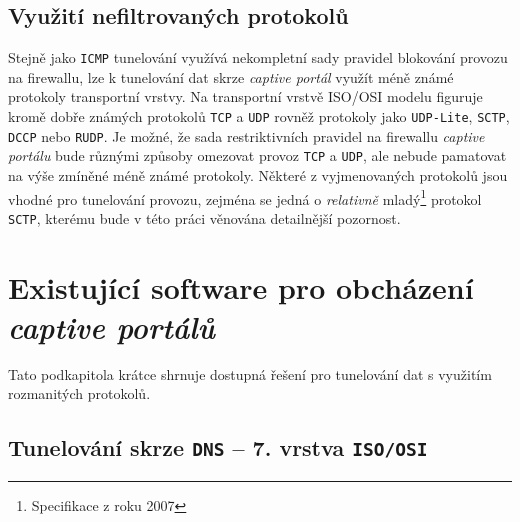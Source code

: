 \documentclass[thesis=M,czech]{FITthesis}[2012/10/20]
\begin{document}
\subsection{Využití nefiltrovaných protokolů}

Stejně jako \texttt{ICMP} tunelování využívá nekompletní sady pravidel blokování provozu na firewallu, lze k tunelování dat skrze \textit{captive portál} využít méně známé protokoly transportní vrstvy. Na transportní vrstvě ISO/OSI modelu figuruje kromě dobře známých protokolů \texttt{TCP} a \texttt{UDP} rovněž protokoly jako \texttt{UDP-Lite}, \texttt{SCTP}, \texttt{DCCP} nebo \texttt{RUDP}. Je možné, že sada restriktivních pravidel na firewallu \textit{captive portálu} bude různými způsoby omezovat provoz \texttt{TCP} a \texttt{UDP}, ale nebude pamatovat na výše zmíněné méně známé protokoly. Některé z vyjmenovaných protokolů jsou vhodné pro tunelování provozu, zejména se jedná o \textit{relativně} mladý\footnote{Specifikace z roku 2007} protokol \texttt{SCTP}, kterému bude v této práci věnována detailnější pozornost.

%

\pagebreak


\section{Existující software pro obcházení \textit{captive portálů}}

Tato podkapitola krátce shrnuje dostupná řešení pro tunelování dat s využitím rozmanitých protokolů.

\subsection{Tunelování skrze \texttt{DNS} -- 7. vrstva \texttt{ISO/OSI}}
\end{document}
